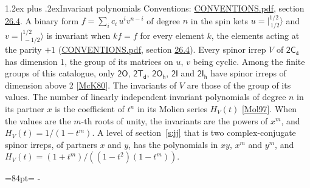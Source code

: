 \documentclass[10pt,a4paper]{article}
\makeatletter
\renewcommand\section{\@startsection{section}{1}{\z@}{-3ex plus -1ex minus -.2ex}%
  {1.2ex plus .2ex}{\normalfont\large\sffamily\bfseries\color{parttitle}}}
\newcommand{\needspace}[1]{\par\penalty-100\begingroup\dimen0=#1\relax\dimen2=\pagegoal
  \advance\dimen2-\pagetotal\ifdim\dimen0>\dimen2\relax\ifdim\dimen2>0pt\vfil\break\fi\fi
  \endgroup}
\numberwithin{equation}{section}
\newcommand{\grp}[1]{\mathsf{#1}}
\newcommand{\jm}[2]{\bigl\lvert{}^{#1}_{\,#2}\bigr\rangle}
\makeatother
\begin{document}
\section{Invariant polynomials}\label{s:invariants}
Conventions: \href{../../CONVENTIONS.pdf}{CONVENTIONS.pdf}, section \href{../../CONVENTIONS.pdf\#conv.26.4}{26.4}.
\leavevmode\label{n:local.binary.form}A binary form $f = \sum_i c_i\, u^i v^{n-i}$ of degree $n$ in the spin kets $u = \jm{1/2}{1/2}$ and $v = \jm{1/2}{-1/2}$ is invariant when $k f = f$ for every element $k$, the elements acting at the parity $+1$ (\href{../../CONVENTIONS.pdf}{CONVENTIONS.pdf}, section \href{../../CONVENTIONS.pdf\#conv.26.4}{26.4}).
\leavevmode\label{n:function.hilbert}Every spinor irrep $V$ of $\grp{2C_{4}}$ has dimension 1, the group of its matrices on $u$, $v$ being cyclic. Among the finite groups of this catalogue, only $\grp{2O}$, $\grp{2T_{d}}$, $\grp{2O_{h}}$, $\grp{2I}$ and $\grp{2I_{h}}$ have spinor irreps of dimension above 2 [\href{../../../REFERENCES.pdf\#ref.McK80}{McK80}]. The invariants of $V$ are those of the group of its values. \label{n:local.partner.x}The number of linearly independent invariant polynomials of degree $n$ in its partner $x$ is the coefficient of $t^n$ in its Molien series $H_V(t)$ [\href{../../../REFERENCES.pdf\#ref.Mol97}{Mol97}]. When the values are the $m$-th roots of unity, the invariants are the powers of $x^{m}$, and $H_V(t) = 1/(1 - t^{m})$. A level of section~\ref{s:jj} that is two complex-conjugate spinor irreps, of partners $x$ and $y$, has the polynomials in $xy$, $x^{m}$ and $y^{m}$, and $H_V(t) = (1 + t^{m})/((1 - t^{2})(1 - t^{m}))$.
\needspace{84pt}
\end{document}
